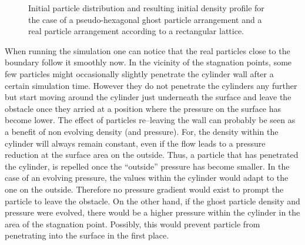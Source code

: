 \documentclass[11pt,a4paper,twoside]{report}
\begin{document}
\begin{figure}[h]
\centering
\label{fig:PorosResultsCylinder_prtlDiscontinuity_reglatice_pseudoHex}

\caption[Initial situation for cylinder porosities]{Initial particle distribution   and resulting initial density profile  for the case of a pseudo-hexagonal ghost particle arrangement and a real particle arrangement according to a rectangular lattice.}
\end{figure}


When running the simulation one can notice that the real particles close to the boundary follow it smoothly now. In the vicinity of the stagnation points, some few particles might occasionally slightly penetrate the cylinder wall after a certain simulation time. However they do not penetrate the cylinders any further but start moving around the cylinder just underneath the surface and leave the obstacle once they arried at a position where the pressure on the surface has become lower.
The effect of particles re--leaving the wall can probably be seen as a benefit of non evolving density (and pressure). For, the density within the cylinder will always remain constant, even if the flow leads to a pressure reduction at the surface area on the outside. Thus, a particle that has penetrated the cylinder, is repelled once the ``outside'' pressure has become smaller. In the case of an evolving pressure, the values within the cylinder would adapt to the one on the outside. Therefore no pressure gradient would exist to prompt the particle to leave the obstacle. 
On the other hand, if the ghost particle density and pressure were evolved, there would be a higher pressure within the cylinder in the area of the stagnation point. Possibly, this would prevent particle from penetrating into the surface in the first place.
\end{document}
